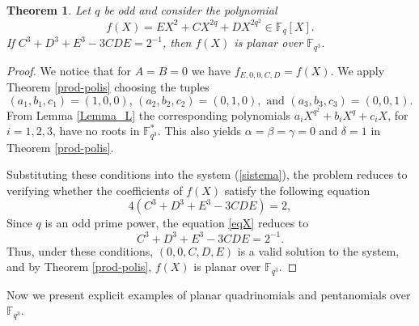 \documentclass[12pt]{amsart}
\newtheorem{theorem}{Theorem}[section]
\begin{document}
	
	\begin{theorem}\label{samefactor}
		Let $q$ be odd and consider the polynomial
		$$f(X) = EX^2 + CX^{2q} +DX^{2q^2}\in \mathbb{F}_q[X].
		$$
		If $C^3 + D^3 + E^3 - 3CDE = 2^{-1}$,  then $f(X)$ is planar over $\mathbb{F}_{q^3}$.  
	\end{theorem}
	
	\begin{proof}
		We notice that for $A=B=0$  we have $f_{E,0,0,C,D}=f(X)$.
		We apply Theorem \ref{prod-polis}  choosing the tuples $$(a_1, b_1, c_1)=(1,0,0) , \,  (a_2, b_2, c_2)=(0,1,0), \text{ and } (a_3, b_3, c_3)=(0,0,1).$$ From Lemma \ref{Lemma_L}  the corresponding polynomials   $a_iX^{q^2} + b_iX^q + c_iX$, for $i=1,2,3 $, have no roots in $\mathbb{F}_{q^3}^*$.  This also yields $\alpha=\beta=\gamma=0$ and $\delta=1$ in Theorem \ref{prod-polis}. 
		
		Substituting these conditions into the system (\ref{sistema}), the problem reduces to verifying whether the coefficients of $f(X)$ satisfy the following equation
		\begin{equation}
			\label{eqX}
			4(C^3 + D^3 + E^3 - 3CDE) = 2,
		\end{equation}
		Since $q$ is an odd prime power, the equation \eqref{eqX} reduces to 
		\[
		C^3 + D^3 + E^3 - 3CDE = 2^{-1}. 
		\]
		Thus, under these conditions, $(0,0,C,D,E)$ is a valid solution to the system, and by Theorem \ref{prod-polis}, $f(X)$ is planar over $\mathbb{F}_{q^3}$.
	\end{proof}
	
	Now we present explicit examples of planar quadrinomials and pentanomials over $\mathbb{F}_{q^3}$.
	
\end{document}
